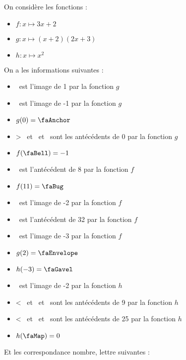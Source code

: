 \documentclass[12pt,a4paper,french,fleqn]{/home/nyaucki/Documents/Prof/CoursMaths/mycls/activite}
\begin{document}


On considère les fonctions : 
\begin{multicols}{3}
    \begin{itemize}
        \item $f:x\mapsto 3x+2$
        \item $g:x\mapsto (x+2)(2x+3)$
        \item $h:x\mapsto x^2$
    \end{itemize}
\end{multicols}

On a les informations suivantes :

\begin{multicols}{2}
    \begin{itemize}
        \item \remplacem ~est l'image de 1 par la fonction $g$
        \item \remplaceo ~est l'image de -1 par la fonction $g$
        \item $g(0)=\remplacen$
        \item \remplaces > \remplacei ~et \remplaces ~et \remplacei ~sont les antécédents de 0 par la fonction $g$
        \item $f(\remplacee )=-1$
        \item \remplaceu ~est l'antécédent de 8 par la fonction $f$
        \item $f(11)=\remplacer $
        \item \remplace ~est l'image de -2 par la fonction $f$
        \item \remplacel ~est l'antécédent de 32 par la fonction $f$
        \item \remplacez ~est l'image de -3 par la fonction $f$
        \item $g(2)=\remplacev$
        \item $h(-3)=\remplaceh$
        \item \remplacea ~est l'image de -2 par la fonction $h$
        \item \remplacet < \remplaced ~et \remplacet ~et \remplaced ~sont les antécédents de 9 par la fonction $h$
        \item \remplacex < \remplaceq ~et \remplacex ~et  \remplaceq ~sont les antécédents de 25 par la fonction $h$
        \item $h(\remplacec)=0$
    \end{itemize}
\end{multicols}

Et les correspondance nombre, lettre suivantes :
\end{document}
